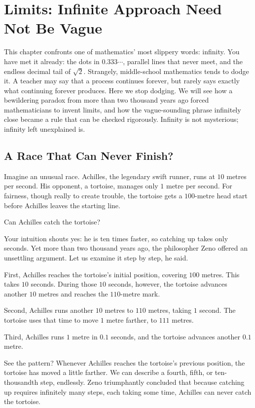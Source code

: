 \chapter{Limits: Infinite Approach Need Not Be Vague}

This chapter confronts one of mathematics' most slippery words: infinity. You have met it already: the dots in $0.333\cdots$, parallel lines that never meet, and the endless decimal tail of $\sqrt{2}$. Strangely, middle-school mathematics tends to dodge it. A teacher may say that a process continues forever, but rarely says exactly what continuing forever produces. Here we stop dodging. We will see how a bewildering paradox from more than two thousand years ago forced mathematicians to invent limits, and how the vague-sounding phrase infinitely close became a rule that can be checked rigorously. Infinity is not mysterious; infinity left unexplained is.

\section{A Race That Can Never Finish?}

Imagine an unusual race. Achilles, the legendary swift runner, runs at $10$ metres per second. His opponent, a tortoise, manages only $1$ metre per second. For fairness, though really to create trouble, the tortoise gets a $100$-metre head start before Achilles leaves the starting line.

Can Achilles catch the tortoise?

Your intuition shouts yes: he is ten times faster, so catching up takes only seconds. Yet more than two thousand years ago, the philosopher Zeno offered an unsettling argument. Let us examine it step by step, he said.

First, Achilles reaches the tortoise's initial position, covering $100$ metres. This takes $10$ seconds. During those $10$ seconds, however, the tortoise advances another $10$ metres and reaches the $110$-metre mark.

Second, Achilles runs another $10$ metres to $110$ metres, taking $1$ second. The tortoise uses that time to move $1$ metre farther, to $111$ metres.

Third, Achilles runs $1$ metre in $0.1$ seconds, and the tortoise advances another $0.1$ metre.

See the pattern? Whenever Achilles reaches the tortoise's previous position, the tortoise has moved a little farther. We can describe a fourth, fifth, or ten-thousandth step, endlessly. Zeno triumphantly concluded that because catching up requires infinitely many steps, each taking some time, Achilles can never catch the tortoise.

